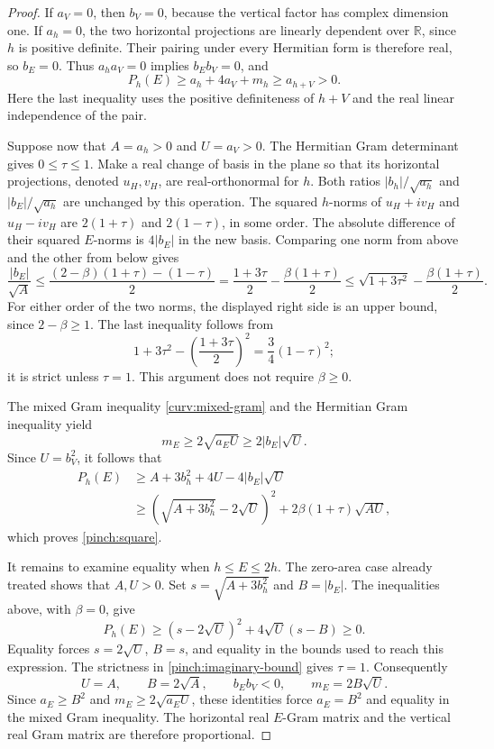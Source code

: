 \begin{proof}
If \(a_V=0\), then \(b_V=0\), because the vertical factor has complex
dimension one.
If \(a_h=0\), the two horizontal projections are linearly dependent
over \(\mathbb R\), since \(h\) is positive definite.
Their pairing under every Hermitian form is therefore real, so
\(b_E=0\).
Thus \(a_ha_V=0\) implies \(b_Eb_V=0\), and
\[
 P_h(E)\ge a_h+4a_V+m_h\ge a_{h+V}>0.
\]
Here the last inequality uses the positive definiteness of \(h+V\)
and the real linear independence of the pair.

Suppose now that \(A=a_h>0\) and \(U=a_V>0\).
The Hermitian Gram determinant gives \(0\le\tau\le1\).
Make a real change of basis in the plane so that its horizontal
projections, denoted \(u_H,v_H\), are real-orthonormal for \(h\).
Both ratios \(|b_h|/\sqrt{a_h}\) and \(|b_E|/\sqrt{a_h}\) are unchanged
by this operation.
The squared \(h\)-norms of \(u_H+i v_H\) and \(u_H-i v_H\) are
\(2(1+\tau)\) and \(2(1-\tau)\), in some order.
The absolute difference of their squared \(E\)-norms is \(4|b_E|\)
in the new basis.  Comparing one norm from above and the other from
below gives
\begin{equation}\label{pinch:imaginary-bound}
 \frac{|b_E|}{\sqrt A}
 \le\frac{(2-\beta)(1+\tau)-(1-\tau)}2
 =\frac{1+3\tau}{2}-\frac{\beta(1+\tau)}2
 \le\sqrt{1+3\tau^2}-\frac{\beta(1+\tau)}2.
\end{equation}
For either order of the two norms, the displayed right side is an
upper bound, since \(2-\beta\ge1\).
The last inequality follows from
\[
 1+3\tau^2-\left(\frac{1+3\tau}{2}\right)^2
 =\frac34(1-\tau)^2;
\]
it is strict unless \(\tau=1\).
This argument does not require \(\beta\ge0\).

The mixed Gram inequality \eqref{curv:mixed-gram} and the Hermitian
Gram inequality yield
\[
 m_E\ge2\sqrt{a_EU}\ge2|b_E|\sqrt U.
\]
Since \(U=b_V^2\), it follows that
\[
\begin{aligned}
 P_h(E)
 &\ge A+3b_h^2+4U-4|b_E|\sqrt U\\
 &\ge
 \left(\sqrt{A+3b_h^2}-2\sqrt U\right)^2
 +2\beta(1+\tau)\sqrt{AU},
\end{aligned}
\]
which proves \eqref{pinch:square}.

It remains to examine equality when \(h\le E\le2h\).
The zero-area case already treated shows that \(A,U>0\).
Set \(s=\sqrt{A+3b_h^2}\) and \(B=|b_E|\).
The inequalities above, with \(\beta=0\), give
\[
 P_h(E)\ge(s-2\sqrt U)^2+4\sqrt U(s-B)\ge0.
\]
Equality forces \(s=2\sqrt U\), \(B=s\), and equality in the bounds
used to reach this expression.
The strictness in \eqref{pinch:imaginary-bound} gives \(\tau=1\).
Consequently
\[
 U=A,\qquad B=2\sqrt A,\qquad b_Eb_V<0,\qquad
 m_E=2B\sqrt U.
\]
Since \(a_E\ge B^2\) and \(m_E\ge2\sqrt{a_EU}\), these identities force
\(a_E=B^2\) and equality in the mixed Gram inequality.
The horizontal real \(E\)-Gram matrix and the vertical real Gram matrix
are therefore proportional.


\end{proof}
